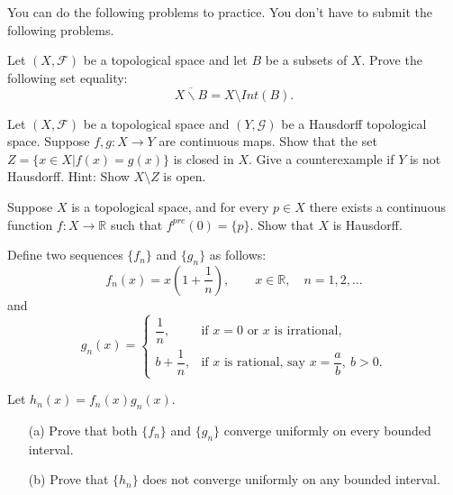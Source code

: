 \documentclass[addpoints]{exam}
\theoremstyle{definition}
\begin{document}
\begin{CJK*}{UTF8}{gbsn}
You can do the following problems to practice. You don't have to submit the following problems.

\begin{questions}

\question   Let $(X,\mathcal{F})$ be a  topological space and let $B$ be a subsets of $X$. Prove the following set equality: 
\begin{equation*}
\overline{X\backslash B}=X\setminus Int(B).
\end{equation*}

\begin{solution}

\end{solution}
\medskip

\question Let $(X,\mathcal{F})$ be a  topological space and $(Y,\mathcal{G})$ be a Hausdorff topological space. 
Suppose $f,g:X\rightarrow Y$ are continuous maps. Show that the set $Z=\{x\in X |f(x)=g(x)\}$ is closed in $X$. Give a counterexample if $Y$ is not Hausdorff. Hint: Show $X \setminus Z$ is open.

\begin{solution}

\end{solution}

\medskip

\question  Suppose $X$ is a topological space, and for every $p\in X$ there exists a
continuous function $f:X\rightarrow \mathbb{R}$ such that $f^{pre}(0)=\{p\}$. Show that $X$ is Hausdorff.


\begin{solution}

\end{solution}

\medskip

\question   Define two sequences $\{f_n\}$ and $\{g_n\}$ as follows:
\[
f_n(x) = x \left(1 + \frac{1}{n}\right), \qquad x \in \mathbb{R}, \quad n = 1, 2, \dots
\]
and
\[
g_n(x) =
\begin{cases}
\dfrac{1}{n}, & \text{if } x = 0 \text{ or } x \text{ is irrational}, \\[8pt]
b + \dfrac{1}{n}, & \text{if } x \text{ is rational, say } x = \dfrac{a}{b}, \ b > 0.
\end{cases}
\]

Let $h_n(x) = f_n(x) g_n(x)$.

\begin{enumerate}
  \item[(a)] Prove that both $\{f_n\}$ and $\{g_n\}$ converge uniformly on every bounded interval.
  \item[(b)] Prove that $\{h_n\}$ does not converge uniformly on any bounded interval.
\end{enumerate}


\end{questions}
\end{CJK*}
\end{document}
